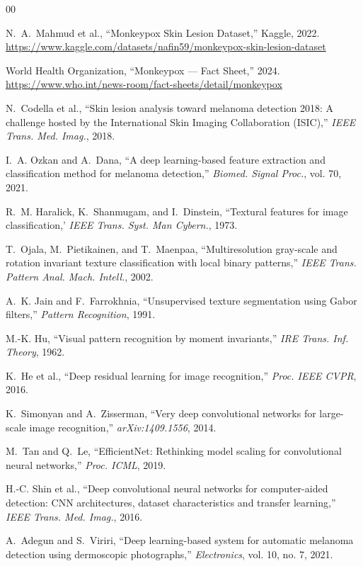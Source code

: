 \documentclass[conference]{IEEEtran}
\begin{document}
\begin{thebibliography}{00}

N.~A.~Mahmud et al., ``Monkeypox Skin Lesion Dataset,'' Kaggle, 2022.
\url{https://www.kaggle.com/datasets/nafin59/monkeypox-skin-lesion-dataset}

World Health Organization, ``Monkeypox --- Fact Sheet,'' 2024.
\url{https://www.who.int/news-room/fact-sheets/detail/monkeypox}

N.~Codella et al., ``Skin lesion analysis toward melanoma detection
2018: A challenge hosted by the International Skin Imaging
Collaboration (ISIC),'' \textit{IEEE Trans. Med. Imag.}, 2018.

I.~A. Ozkan and A.~Dana, ``A deep learning-based feature extraction
and classification method for melanoma detection,''
\textit{Biomed. Signal Proc.}, vol. 70, 2021.

R.~M. Haralick, K.~Shanmugam, and I.~Dinstein, ``Textural features
for image classification,' \textit{IEEE Trans. Syst. Man Cybern.},
1973.

T.~Ojala, M.~Pietikainen, and T.~Maenpaa, ``Multiresolution
gray-scale and rotation invariant texture classification with local
binary patterns,'' \textit{IEEE Trans. Pattern Anal. Mach. Intell.},
2002.

A.~K. Jain and F.~Farrokhnia, ``Unsupervised texture segmentation
using Gabor filters,'' \textit{Pattern Recognition}, 1991.

M.-K. Hu, ``Visual pattern recognition by moment invariants,''
\textit{IRE Trans. Inf. Theory}, 1962.

K.~He et al., ``Deep residual learning for image recognition,''
\textit{Proc. IEEE CVPR}, 2016.

K.~Simonyan and A.~Zisserman, ``Very deep convolutional networks for
large-scale image recognition,'' \textit{arXiv:1409.1556}, 2014.

M.~Tan and Q.~Le, ``EfficientNet: Rethinking model scaling for
convolutional neural networks,'' \textit{Proc. ICML}, 2019.

H.-C. Shin et al., ``Deep convolutional neural networks for
computer-aided detection: CNN architectures, dataset
characteristics and transfer learning,'' \textit{IEEE Trans. Med.
Imag.}, 2016.

A.~Adegun and S.~Viriri, ``Deep learning-based system for
automatic melanoma detection using dermoscopic photographs,''
\textit{Electronics}, vol. 10, no. 7, 2021.

\end{thebibliography}
\end{document}

